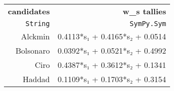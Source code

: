 \begin{table}
  \begin{tabular}{rr}
    \hline\hline
    \textbf{candidates} & \textbf{w_s tallies} \\
    \texttt{String} & \texttt{SymPy.Sym} \\\hline
    Alckmin & 0.4113*s₁ + 0.4165*s₂ + 0.0514 \\
    Bolsonaro & 0.0392*s₁ + 0.0521*s₂ + 0.4992 \\
    Ciro & 0.4387*s₁ + 0.3612*s₂ + 0.1341 \\
    Haddad & 0.1109*s₁ + 0.1703*s₂ + 0.3154 \\\hline\hline
  \end{tabular}
\end{table}
